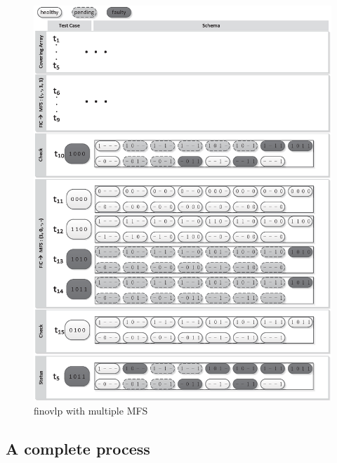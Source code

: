 \begin{figure}[!htb]
 \centering
 \includegraphics[width=5.3in]{finovlp.eps}
 \caption{finovlp with multiple MFS}
 \label{fig_finovlp_multi}
\end{figure}

\subsection{A complete process}

